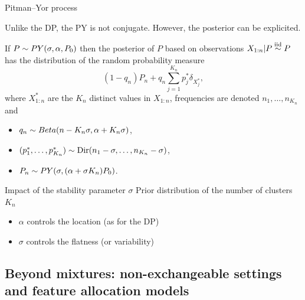 \begin{frame}[allowframebreaks]{Pitman--Yor process}
\framebreak

Unlike the DP, the \alert{PY is not conjugate}. However, the posterior can be explicited.

\begin{theorem}
 If $P\sim PY(\sigma, \alpha, P_0)$ then the posterior of $P$ based on observations $X_{1:n}|P\stackrel{\mbox{\scriptsize{iid}}}{\sim} P$ has the distribution of the random probability measure
\begin{equation*}
    (1-q_n)P_n + q_n \sum_{j=1}^{K_n}p_j^*\delta_{X_j^*},
\end{equation*}
where $X^*_{1:n}$ are the $K_n$ distinct values in $X_{1:n}$, frequencies are denoted $n_1,\ldots,n_{K_n}$ and 
\begin{itemize}
    \item $q_n\sim Beta(n-K_n \sigma, \alpha +K_n\sigma)$,
    \item $(p_1^*, \ldots, p^*_{K_n})\sim \text{Dir}(n_1-\sigma, \ldots, n_{K_n} -\sigma)$,
    \item $P_n\sim PY(\sigma, (\alpha + \sigma K_n)P_0)$.
\end{itemize}
\end{theorem} 
\end{frame}

\begin{frame}{Impact of the stability parameter $\sigma$}
Prior distribution of the number of clusters $K_n$ 
\begin{itemize}
\item<1-> \textcolor<1>{red2}{$\alpha$ controls the location} (as for the DP)
\item<2-> \textcolor<2>{red2}{$\sigma$ controls the flatness (or variability)}
\end{itemize}
\begin{center}
\end{center}
\end{frame}

\subsection{Beyond mixtures: non-exchangeable settings and feature allocation models}

